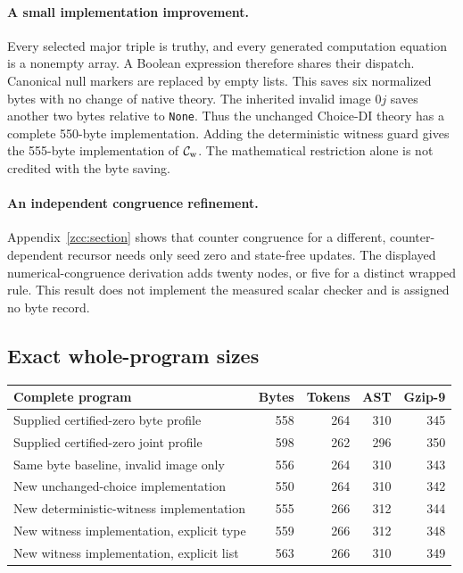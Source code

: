 \documentclass[11pt,letterpaper]{article}
\theoremstyle{definition}\newtheorem{definition}[theorem]{Definition}
\theoremstyle{remark}\newtheorem{remark}[theorem]{Remark}
\begin{document}
\paragraph{A small implementation improvement.}
Every selected major triple is truthy, and every generated computation
equation is a nonempty array. A Boolean expression therefore shares their dispatch.
Canonical null markers are replaced by empty lists. This saves six
normalized bytes with no change of native theory. The inherited invalid
image $0j$ saves another two bytes relative to \texttt{None}. Thus the
unchanged Choice-DI theory has a complete 550-byte implementation. Adding
the deterministic witness guard gives the 555-byte implementation of
$\mathcal C_{\rm w}$. The mathematical restriction alone is not credited
with the byte saving.

\paragraph{An independent congruence refinement.}
Appendix~\ref{zcc:section} shows that counter congruence for a different,
counter-dependent recursor needs only seed zero and state-free updates.
The displayed numerical-congruence derivation adds twenty nodes, or five
for a distinct wrapped rule. This result does not implement the measured
scalar checker and is assigned no byte record.

\subsection{Exact whole-program sizes}

\begin{center}\small
\begin{tabular}{lrrrr}
\toprule
Complete program & Bytes & Tokens & AST & Gzip-9\\
\midrule
Supplied certified-zero byte profile & 558 & 264 & 310 & 345\\
Supplied certified-zero joint profile & 598 & 262 & 296 & 350\\
Same byte baseline, invalid image only & 556 & 264 & 310 & 343\\
New unchanged-choice implementation & 550 & 264 & 310 & 342\\
New deterministic-witness implementation & 555 & 266 & 312 & 344\\
New witness implementation, explicit type & 559 & 266 & 312 & 348\\
New witness implementation, explicit list & 563 & 266 & 310 & 349\\
\bottomrule
\end{tabular}
\end{center}
\end{document}
